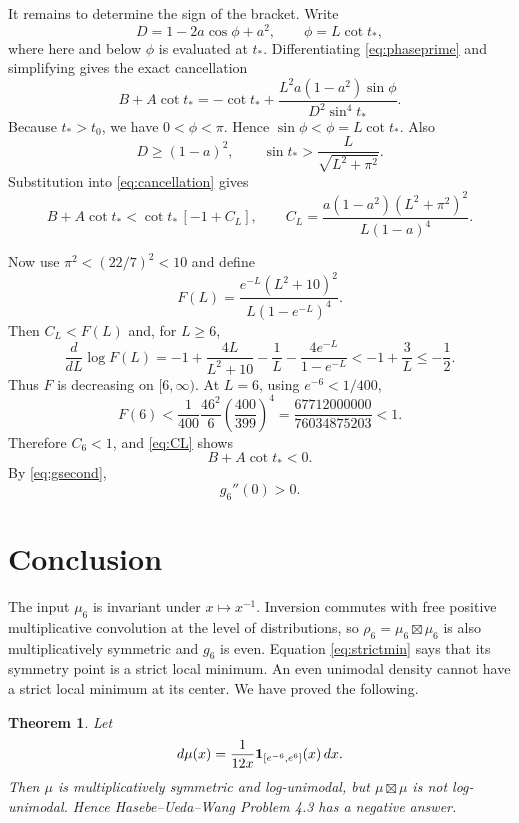 \documentclass[11pt]{article}
\newtheorem{theorem}{Theorem}
\newcommand{\boxt}{\mathbin{\boxtimes}}
\begin{document}
It remains to determine the sign of the bracket.  Write
\[
 D=1-2a\cos\phi+a^2,
 \qquad \phi=L\cot t_*,
\]
where here and below $\phi$ is evaluated at $t_*$.  Differentiating
\eqref{eq:phaseprime} and simplifying gives the exact cancellation
\begin{equation}\label{eq:cancellation}
 B+A\cot t_*
 =-\cot t_*
 +\frac{L^2a(1-a^2)\sin\phi}{D^2\sin^4t_*}.
\end{equation}
Because $t_*>t_0$, we have $0<\phi<\pi$.  Hence
$\sin\phi<\phi=L\cot t_*$.  Also
\[
 D\geq(1-a)^2,
 \qquad
 \sin t_*>\frac{L}{\sqrt{L^2+\pi^2}}.
\]
Substitution into \eqref{eq:cancellation} gives
\begin{equation}\label{eq:CL}
 B+A\cot t_*<\cot t_*\,[-1+C_L],
 \qquad
 C_L=\frac{a(1-a^2)(L^2+\pi^2)^2}{L(1-a)^4}.
\end{equation}

Now use $\pi^2<(22/7)^2<10$ and define
\[
 F(L)=\frac{e^{-L}(L^2+10)^2}{L(1-e^{-L})^4}.
\]
Then $C_L<F(L)$ and, for $L\geq6$,
\[
 \frac{d}{dL}\log F(L)
 =-1+\frac{4L}{L^2+10}-\frac1L
   -\frac{4e^{-L}}{1-e^{-L}}
 <-1+\frac3L\leq-\frac12.
\]
Thus $F$ is decreasing on $[6,\infty)$.  At $L=6$, using $e^{-6}<1/400$,
\begin{equation}\label{eq:rational}
 F(6)
 <\frac1{400}\frac{46^2}{6}\left(\frac{400}{399}\right)^4
 =\frac{67712000000}{76034875203}<1.
\end{equation}
Therefore $C_6<1$, and \eqref{eq:CL} shows
\[
 B+A\cot t_*<0.
\]
By \eqref{eq:gsecond},
\begin{equation}\label{eq:strictmin}
 \boxed{g_6''(0)>0.}
\end{equation}

\section{Conclusion}

The input $\mu_6$ is invariant under $x\mapsto x^{-1}$.  Inversion commutes
with free positive multiplicative convolution at the level of distributions,
so $\rho_6=\mu_6\boxt\mu_6$ is also multiplicatively symmetric and $g_6$ is
even.  Equation \eqref{eq:strictmin} says that its symmetry point is a strict
local minimum.  An even unimodal density cannot have a strict local minimum at
its center.  We have proved the following.

\begin{theorem}
Let
\[
 d\mu(x)=\frac{1}{12x}{\bf 1}_{[e^{-6},e^6]}(x)\,dx.
\]
Then $\mu$ is multiplicatively symmetric and log-unimodal, but
$\mu\boxt\mu$ is not log-unimodal.  Hence Hasebe--Ueda--Wang Problem 4.3 has a
negative answer.
\end{theorem}
\end{document}
